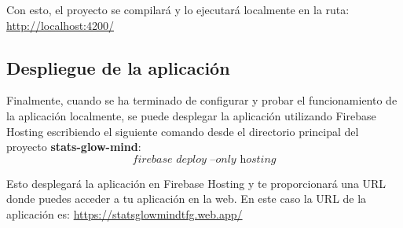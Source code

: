 Con esto, el proyecto se compilará y lo ejecutará localmente en la ruta: \url{http://localhost:4200/}

\subsection{Despliegue de la aplicación}

Finalmente, cuando se ha terminado de configurar y probar el funcionamiento de la aplicación localmente, se puede desplegar la aplicación utilizando Firebase Hosting escribiendo el siguiente comando desde el directorio principal del proyecto \textbf{stats-glow-mind}:
$$ \textit{firebase deploy --only hosting} $$

Esto desplegará la aplicación en Firebase Hosting y te proporcionará una URL donde puedes acceder a tu aplicación en la web. En este caso la URL de la aplicación es: 
\url{https://statsglowmindtfg.web.app/}